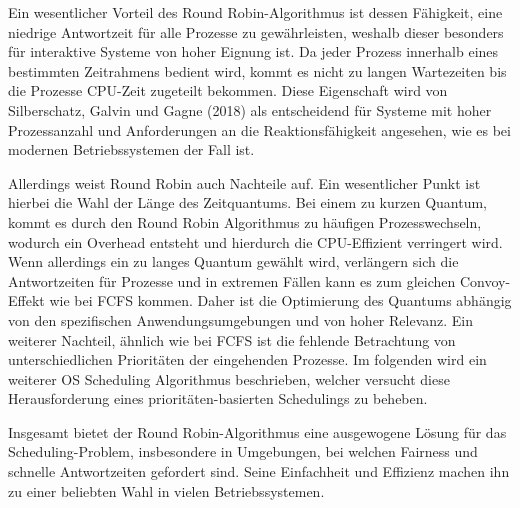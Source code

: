 Ein wesentlicher Vorteil des Round Robin-Algorithmus ist dessen Fähigkeit, eine niedrige Antwortzeit für alle Prozesse zu gewährleisten, weshalb dieser besonders für interaktive Systeme von hoher Eignung ist. Da jeder Prozess innerhalb eines bestimmten Zeitrahmens bedient wird, kommt es nicht zu langen Wartezeiten bis die Prozesse \ac{CPU}-Zeit zugeteilt bekommen. Diese Eigenschaft wird von Silberschatz, Galvin und Gagne (2018) als entscheidend für Systeme mit hoher Prozessanzahl und Anforderungen an die Reaktionsfähigkeit angesehen, wie es bei modernen Betriebssystemen der Fall ist. 

Allerdings weist Round Robin auch Nachteile auf. Ein wesentlicher Punkt ist hierbei die Wahl der Länge des Zeitquantums. Bei einem zu kurzen Quantum, kommt es durch den Round Robin Algorithmus zu häufigen Prozesswechseln, wodurch ein Overhead entsteht und hierdurch die \ac{CPU}-Effizient verringert wird. %
Wenn allerdings ein zu langes Quantum gewählt wird, verlängern sich die Antwortzeiten für Prozesse und in extremen Fällen kann es zum gleichen Convoy-Effekt wie bei \ac{FCFS} kommen. Daher ist die Optimierung des Quantums abhängig von den spezifischen Anwendungsumgebungen und von hoher Relevanz. Ein weiterer Nachteil, ähnlich wie bei \ac{FCFS} ist die fehlende Betrachtung von unterschiedlichen Prioritäten der eingehenden Prozesse. Im folgenden wird ein weiterer OS Scheduling Algorithmus beschrieben, welcher versucht diese Herausforderung eines prioritäten-basierten Schedulings zu beheben. 

Insgesamt bietet der Round Robin-Algorithmus eine ausgewogene Lösung für das Scheduling-Problem, insbesondere in Umgebungen, bei welchen Fairness und schnelle Antwortzeiten gefordert sind. Seine Einfachheit und Effizienz machen ihn zu einer beliebten Wahl in vielen Betriebssystemen.



